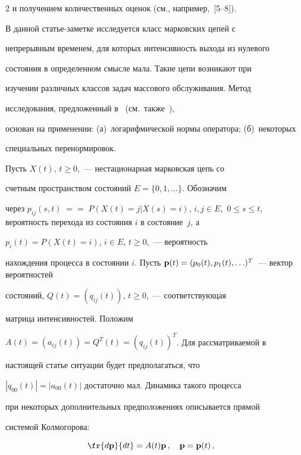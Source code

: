 \begin{multicols}{2}
и получением количественных оценок (см., например,~[5--8]).





В данной статье-заметке исследуется класс марковских цепей с


непрерывным временем, для которых интенсивность выхода из нулевого


состояния в определенном смысле мала.  Такие цепи возникают при


изучении различных классов задач массового обслуживания. Метод


исследования, предложенный в~\cite{z95} (см.\ также~\cite{z08}),


основан на применении: (а)~логарифмической нормы оператора; (б)~некоторых


специальных перенормировок.





\medskip


Пусть $X(t)$,  $t\geq 0$,~--- нестационарная марковская цепь со


счетным прост\-ранст\-вом состояний $E=\{0,1,\ldots \}$. Обозначим


через $p_{ij}(s,t)\;=$\linebreak $=\;P(X(t)=j | X(s)=i)$, $i,j\in E,$ $0\leq s\leq


t$, вероятность перехода из состояния $i$ в состояние~$j$, а


$p_{i}(t)=P(X(t)=i)$, $i\in E$, $t\geq 0$,~--- вероятность


нахождения процесса в состоянии $i$. Пусть ${\bf


p}(t)=(p_{0}(t),p_{1}(t),\ldots )^{T}$~--- вектор вероятностей


состояний, $Q(t)=(q_{ij}(t))$,  $t\geq 0$,~--- соответствующая


матрица интенсивностей. Положим


$A(t)=(a_{ij}(t))=Q^{T}(t)=(q_{ij}(t))^{T}$. Для рассматриваемой в


настоящей статье ситуации  будет предполагаться, что


$|q_{00}(t)|=|a_{00}(t)|$ достаточно мал. Динамика такого процесса


при некоторых дополнительных предположениях описывается прямой


системой Колмогорова:


\begin{equation}


  \fr{d {\bf p}}{dt}=A(t){\bf p}\,,\quad {\bf p}={\bf p}(t)\,,\quad



\end{equation}
\end{multicols}
